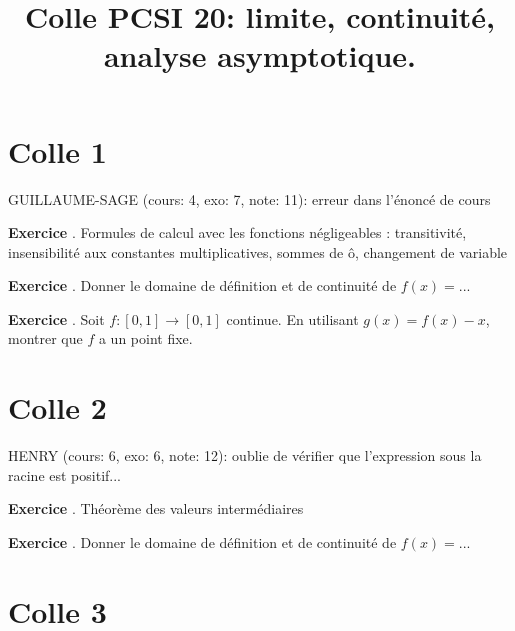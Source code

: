 \documentclass[10pt,a4paper]{article}
\title{Colle PCSI 20: limite, continuité, analyse asymptotique.}
\newcounter{question}
\newcounter{exo}
\newenvironment{exo}{\vspace{0.5cm}\setcounter{question}{0}\addtocounter{exo}{1} \noindent \textbf{Exercice \theexo}. \normalsize }{\par}
\begin{document}
	\maketitle
	
	
	\section*{Colle 1}
	\setcounter{exo}{0}
	GUILLAUME-SAGE (cours: 4, exo: 7, note: 11): erreur dans l'énoncé de cours\\
	
	\begin{exo}
		Formules de calcul avec les fonctions négligeables : transitivité, insensibilité aux constantes multiplicatives, sommes de ô, changement de variable
	\end{exo}

	\begin{exo}
		Donner le domaine de définition et de continuité de $f(x) = ...$
	\end{exo}
	
	\begin{exo}
		Soit $f: [0, 1] \rightarrow [0, 1]$ continue. En utilisant $g(x) = f(x) - x$, montrer que $f$ a un point fixe.
	\end{exo}

	\section*{Colle 2}
	\setcounter{exo}{0}
	HENRY (cours: 6, exo: 6, note: 12): oublie de vérifier que l'expression sous la racine est positif...\\
	
	\begin{exo}
		Théorème des valeurs intermédiaires
	\end{exo}		

	\begin{exo}
		Donner le domaine de définition et de continuité de $f(x) = ...$
	\end{exo}

	\section*{Colle 3}
	\setcounter{exo}{0}
	
\end{document}

